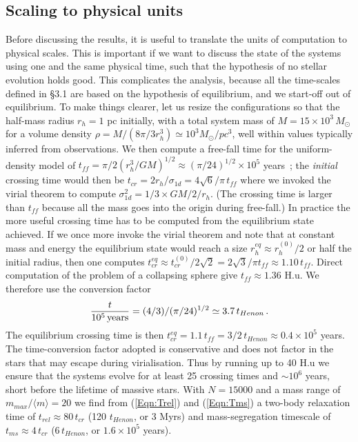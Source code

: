 \subsection{Scaling to physical units}
Before discussing the results, it is useful to translate the units of computation to physical scales. This is important if we want to discuss the state of the systems using one and the same physical time, such that the hypothesis of no stellar evolution holds good.
This complicates the analysis, because all the time-scales defined in \S 3.1 are based on the hypothesis of equilibrium, and we start-off out of equilibrium. To make things clearer, let us resize the configurations so that the half-mass radius $r_h = 1$ pc initially, with a total system mass of $M = 15\times 10^3\, M_\odot$ for a volume density $\rho = M / (8\pi/3 r_h^3) \simeq 10^3 M_\odot / pc^3$, well within values typically inferred from observations. 
We then compute a free-fall time for the uniform-density model of $t_{ff} = \pi /2 \left( r_h^3 / GM \right)^{1/2} \approx (\pi/24)^{1/2} \times 10^5 $ years~; the {\it initial} crossing time would then be $t_{cr} = 2 r_h / \sigma_{1d} = 4\sqrt{6}/\pi \,t_{ff} $ where we invoked the virial theorem to compute $\sigma^2_{1d} = 1/3 \times GM/2 / r_h $. (The crossing time is larger than $t_{ff}$ because all the mass goes into the origin during free-fall.)  
In practice the more useful crossing time has to be computed from the equilibrium state achieved. If we once more invoke the virial theorem and note that at constant mass and energy the equilibrium state would reach a size $r_h^{eq} \approx r_h^{(0)}/2$ or half the initial radius, then one computes $t_{cr}^{eq} \approx t_{cr}^{(0)} / 2\sqrt{2} =  2\sqrt{3}/\pi t_{ff} \approx 1.10 \, t_{ff}$. 
Direct computation of the problem of a collapsing sphere give $t_{ff} \approx 1.36$ H.u. We therefore use the conversion factor \[ \frac{t}{{10^5\,{\rm years}}} = (4/3) / (\pi/24)^{1/2} \simeq  3.7\, t_{Henon} \,. \]  The equilibrium crossing time is then $t_{cr}^{eq} = 1.1\, t_{ff} = 3/2 \, t_{Henon} \approx 0.4 \times 10^5 $ years. The time-conversion factor adopted is conservative and does not factor in the stars that may escape during virialisation.%
Thus by running up to 40 H.u we ensure that the systems evolve for at least 25 crossing times and $ \sim 10^6 $ years, short before the lifetime of massive stars.  With $N = 15 000$ and a mass range of $m_{max}/\langle m\rangle = 20$ we find from (\ref{Eqn:Trel}) and (\ref{Eqn:Tms}) a two-body relaxation time of $t_{rel} \approx 80\,t_{cr} $ (120 $t_{Henon}$, or 3 Myrs) and mass-segregation timescale of $t_{ms} \approx 4\, t_{cr} $ ($6\, t_{Henon}$, or $1.6\times 10^5$ years).  
  
